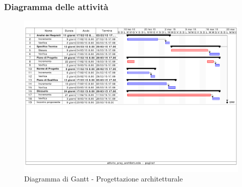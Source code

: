 		\subsubsection{Diagramma delle attività} %
		\label{ssub:diagramma_delle_attivita}
			\begin{figure}[htbp]
				\centering
				\centerline{\includegraphics[scale=0.7]{images/d_attivita_prog_architetturale.pdf}}
				\caption{Diagramma di Gantt - Progettazione architetturale}
				\label{fig:gantt_prog_architetturale}				
			\end{figure}
	
